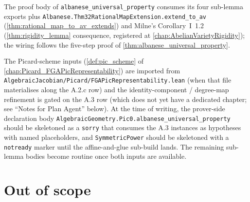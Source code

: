The proof body of \texttt{albanese\_universal\_property} consumes its four
sub-lemma exports plus \texttt{Albanese.Thm32RationalMapExtension.extend\_to\_av}
(\cref{thm:rational_map_to_av_extends}) and Milne's Corollary~I~1.2
(\cref{thm:rigidity_lemma} consequence, registered at
\cref{chap:AbelianVarietyRigidity}); the wiring follows the five-step proof
of \cref{thm:albanese_universal_property}.

The Picard-scheme inputs (\cref{def:pic_scheme} of
\cref{chap:Picard_FGAPicRepresentability}) are imported from
\texttt{AlgebraicJacobian/Picard/FGAPicRepresentability.lean} (when that file
materialises along the A.2.c row) and the identity-component / degree-map
refinement is gated on the A.3 row (which does not yet have a dedicated
chapter; see ``Notes for Plan Agent'' below). At the time of writing, the
prover-side declaration body
\texttt{AlgebraicGeometry.Pic0.albane\-se\_universal\_property} should be
skeletoned as a \texttt{sorry} that consumes the A.3 instances as
hypotheses with named placeholders, and \texttt{Sym\-met\-ric\-Power} should
be skeletoned with a \texttt{notready} marker until the affine-and-glue
sub-build lands. The remaining sub-lemma bodies become routine once both
inputs are available.

\section{Out of scope}
\label{sec:albaneseup_out_of_scope}

